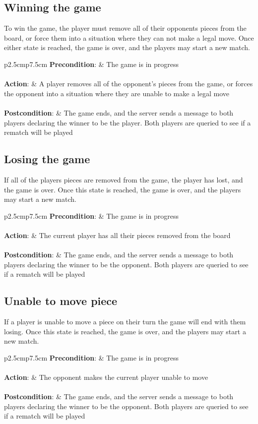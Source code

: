\documentclass[letterpaper]{article}
\newcommand{\prepost}[3]
{
    \begin{tabulary}{\linewidth}{p{2.5cm}p{7.5cm}}
    \textbf{Precondition}:  & #1\\\\
    \textbf{Action}:        & #2\\\\
    \textbf{Postcondition}: & #3\\
    \end{tabulary}
}
\begin{document}
\subsection{Winning the game}
\label{sec:usecases_winning}

To win the game, the player must remove all of their opponents
pieces from the board, or force them into a situation where they
can not make a legal move. Once either state is reached, the
game is over, and the players may start a new match.\\

\prepost
{The game is in progress}
{A player removes all of the opponent's pieces from the game, 
or forces the opponent into a situation where they are unable
to make a legal move}
{The game ends, and the server sends a message to both players
declaring the winner to be the player. Both players are queried
to see if a rematch will be played}

\subsection{Losing the game}
\label{sec:usecases_losing}

If all of the players pieces are removed from the game, the
player has lost, and the game is over. Once this state is
reached, the game is over, and the players may start a new
match.\\

\prepost
{The game is in progress}
{The current player has all their pieces removed from the board}
{The game ends, and the server sends a message to both players
declaring the winner to be the opponent. Both players are
queried to see if a rematch will be played}

\subsection{Unable to move piece}
\label{sec:usecases_immobile}

If a player is unable to move a piece on their turn the game
will end with them losing. Once this state is reached, the game
is over, and the players may start a new match.\\

\prepost
{The game is in progress}
{The opponent makes the current player unable to move}
{The game ends, and the server sends a message to both players
declaring the winner to be the opponent. Both players are
queried to see if a rematch will be played}
\end{document}
